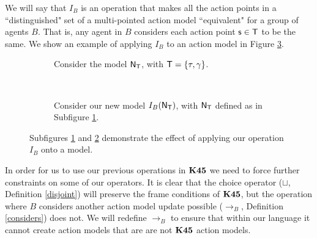 We will say that $I_B$ is an operation that makes all the action
points in a ``distinguished" set of a multi-pointed action model ``equivalent" for a group of agents $B$.
That is, any agent in $B$ considers each action point $\mathrm{\mathsf{s}} \in \mathrm{\mathsf{T}}$ to be the
same.
We show an example of applying $I_B$ to an action model in Figure \ref{beforeAfterI}.

\begin{figure}
\centering
\begin{subfigure}[b]{.45\textwidth}
\centering
{}
\caption{Consider the model $\mathrm{\mathsf{N}}_\mathrm{\mathsf{T}}$, with $\mathrm{\mathsf{T}} = \{\tau, \gamma\}$.}
\label{beforeOperation}
\end{subfigure}
~
\begin{subfigure}[b]{.45\textwidth}
\centering
{}
\caption{Consider our new model $I_B(\mathrm{\mathsf{N}}_\mathrm{\mathsf{T}})$, with $\mathrm{\mathsf{N}}_\mathrm{\mathsf{T}}$ defined as in Subfigure
\ref{beforeOperation}.}
\label{afterOperation}
\end{subfigure}
\caption[Result of applying $I_B$]{Subfigures \ref{beforeOperation} and \ref{afterOperation} demonstrate the effect of
applying our operation $I_B$ onto a model.}
\label{beforeAfterI}
\end{figure}

In order for us to use our previous operations in $\bf K45$ we need to force further constraints on
some of our operators.
It is clear that the choice operator ($\sqcup$, Definition \ref{disjoint}) will preserve the frame
conditions of $\bf K45$, but the operation where $B$ considers another action model update possible
($\to_B$, Definition \ref{considers}) does not.
We will redefine $\to_B$ to ensure that within our language it cannot create action models that are
are not $\bf K45$ action models.

